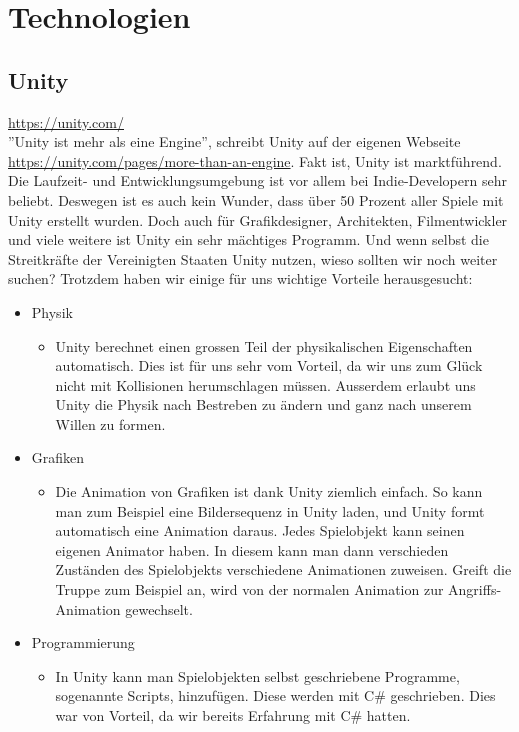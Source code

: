 \chapter{Technologien}

\section{Unity}
\url{https://unity.com/}\\
''Unity ist mehr als eine Engine'', schreibt Unity auf der eigenen Webseite \url{https://unity.com/pages/more-than-an-engine}. Fakt ist, Unity ist marktführend. Die Laufzeit- und Entwicklungsumgebung 
ist vor allem bei Indie-Developern sehr beliebt. Deswegen ist es auch kein Wunder, dass über 50 Prozent aller Spiele mit Unity erstellt wurden. 
Doch auch für Grafikdesigner, Architekten, Filmentwickler und viele weitere ist Unity ein sehr mächtiges Programm. Und wenn selbst die Streitkräfte der Vereinigten Staaten Unity nutzen, wieso sollten wir 
noch weiter suchen? Trotzdem haben wir einige für uns wichtige Vorteile herausgesucht:\\

\begin{itemize}
    \item Physik
    \begin{itemize}
        \item Unity berechnet einen grossen Teil der physikalischen Eigenschaften automatisch. Dies ist für uns sehr vom Vorteil, da wir uns zum Glück nicht mit Kollisionen herumschlagen müssen.
        Ausserdem erlaubt uns Unity die Physik nach Bestreben zu ändern und ganz nach unserem Willen zu formen.
    \end{itemize}
    \item Grafiken
    \begin{itemize}
        \item Die Animation von Grafiken ist dank Unity ziemlich einfach. So kann man zum Beispiel eine Bildersequenz in Unity laden, und Unity formt automatisch eine Animation daraus. Jedes Spielobjekt kann seinen
        eigenen Animator haben. In diesem kann man dann verschieden Zuständen des Spielobjekts verschiedene Animationen zuweisen. Greift die Truppe zum Beispiel an, wird von der normalen Animation zur Angriffs-Animation
        gewechselt.  
    \end{itemize}
    \item Programmierung
    \begin{itemize}
        \item In Unity kann man Spielobjekten selbst geschriebene Programme, sogenannte Scripts, hinzufügen. Diese werden mit C\# geschrieben. Dies war von Vorteil, da wir bereits Erfahrung mit C\# hatten. 
    \end{itemize}
\end{itemize}

